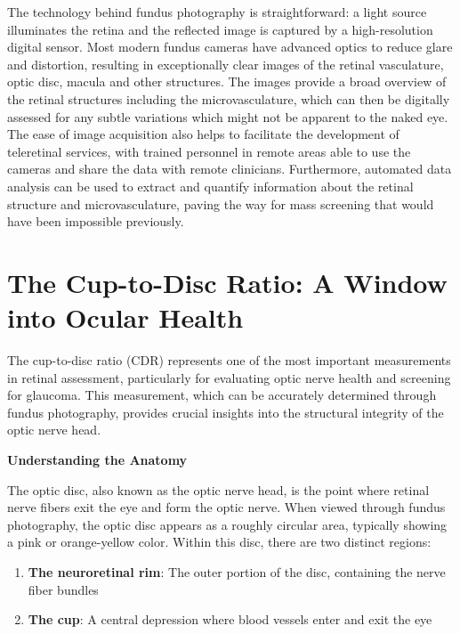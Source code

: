 \documentclass[
  Letterpaper,
]{scrbook}
\providecommand{\tightlist}{%
  \setlength{\itemsep}{0pt}\setlength{\parskip}{0pt}}\usepackage{longtable,booktabs,array}
\begin{document}
The technology behind fundus photography is straightforward: a light
source illuminates the retina and the reflected image is captured by a
high-resolution digital sensor. Most modern fundus cameras have advanced
optics to reduce glare and distortion, resulting in exceptionally clear
images of the retinal vasculature, optic disc, macula and other
structures. The images provide a broad overview of the retinal
structures including the microvasculature, which can then be digitally
assessed for any subtle variations which might not be apparent to the
naked eye. The ease of image acquisition also helps to facilitate the
development of teleretinal services, with trained personnel in remote
areas able to use the cameras and share the data with remote clinicians.
Furthermore, automated data analysis can be used to extract and quantify
information about the retinal structure and microvasculature, paving the
way for mass screening that would have been impossible previously.

\section{The Cup-to-Disc Ratio: A Window into Ocular
Health}\label{the-cup-to-disc-ratio-a-window-into-ocular-health}

The cup-to-disc ratio (CDR) represents one of the most important
measurements in retinal assessment, particularly for evaluating optic
nerve health and screening for glaucoma. This measurement, which can be
accurately determined through fundus photography, provides crucial
insights into the structural integrity of the optic nerve head.

\textbf{Understanding the Anatomy}

The optic disc, also known as the optic nerve head, is the point where
retinal nerve fibers exit the eye and form the optic nerve. When viewed
through fundus photography, the optic disc appears as a roughly circular
area, typically showing a pink or orange-yellow color. Within this disc,
there are two distinct regions:

\begin{enumerate}
\def\labelenumi{\arabic{enumi}.}
\tightlist
\item
  \textbf{The neuroretinal rim}: The outer portion of the disc,
  containing the nerve fiber bundles
\item
  \textbf{The cup}: A central depression where blood vessels enter and
  exit the eye
\end{enumerate}
\end{document}
